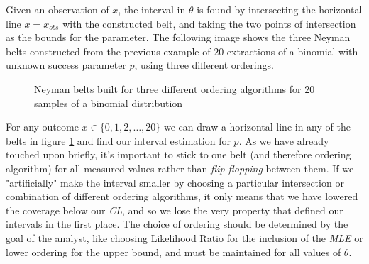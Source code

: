 Given an observation of $x$, the interval in $\theta$ is found by intersecting the horizontal line $x=x_{obs}$ with the constructed belt, and taking the two points of intersection as the bounds for the parameter. The following image shows the three Neyman belts constructed from the previous example of $20$ extractions of a binomial with unknown success parameter $p$, using three different orderings. 

\begin{figure}[H]
	\centering
	
	\caption{Neyman belts built for three different ordering algorithms for $20$ samples of a binomial distribution}
	\label{fig:binomial_Neyman_belts}
\end{figure}

For any outcome $x\in\{0,1,2,\dots,20\}$ we can draw a horizontal line in any of the belts in figure \ref{fig:binomial_Neyman_belts} and find our interval estimation for $p$. As we have already touched upon briefly, it's important to stick to one belt (and therefore ordering algorithm) for all measured values rather than \emph{flip-flopping} between them. If we "artificially" make the interval smaller by choosing a particular intersection or combination of different ordering algorithms, it only means that we have lowered the coverage below our \emph{CL}, and so we lose the very property that defined our intervals in the first place. The choice of ordering should be determined by the goal of the analyst, like choosing Likelihood Ratio for the inclusion of the \emph{MLE} or lower ordering for the upper bound, and must be maintained for all values of $\theta$.


